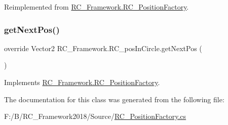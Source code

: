 Reimplemented from \mbox{\hyperlink{class_r_c___framework_1_1_r_c___position_factory_a39eaa0f4f1dfd07225b4880d494d81fa}{R\+C\+\_\+\+Framework.\+R\+C\+\_\+\+Position\+Factory}}.

\mbox{\label{class_r_c___framework_1_1_r_c__pos_in_circle_a4cec38bb6d1617a7ad918d59c5125df9}} 
\subsubsection{\texorpdfstring{get\+Next\+Pos()}{getNextPos()}}
{\footnotesize\ttfamily override Vector2 R\+C\+\_\+\+Framework.\+R\+C\+\_\+pos\+In\+Circle.\+get\+Next\+Pos (\begin{DoxyParamCaption}{ }\end{DoxyParamCaption})\hspace{0.3cm}{\ttfamily [virtual]}}



Implements \mbox{\hyperlink{class_r_c___framework_1_1_r_c___position_factory_aab6cd4cb6a10c8dfa126c4930c6a9fbf}{R\+C\+\_\+\+Framework.\+R\+C\+\_\+\+Position\+Factory}}.



The documentation for this class was generated from the following file\+:\begin{DoxyCompactItemize}
\item 
F\+:/\+B/\+R\+C\+\_\+\+Framework2018/\+Source/\mbox{\hyperlink{_r_c___position_factory_8cs}{R\+C\+\_\+\+Position\+Factory.\+cs}}\end{DoxyCompactItemize}
